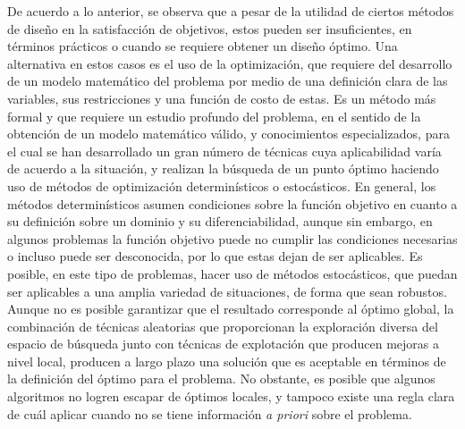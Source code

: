 De acuerdo a lo anterior, se observa que a pesar de la utilidad de ciertos métodos de diseño en la satisfacción de objetivos, estos pueden ser insuficientes, en términos prácticos o cuando se requiere obtener un diseño óptimo. Una alternativa en estos casos es el uso de la optimización, que requiere del desarrollo de un modelo matemático del problema por medio de una definición clara de las variables, sus restricciones y una función de costo de estas. Es un método más formal y que requiere un estudio profundo del problema, en el sentido de la obtención de un modelo matemático válido, y conocimientos especializados, para el cual se han desarrollado un gran número de técnicas cuya aplicabilidad varía de acuerdo a la situación, y realizan la búsqueda de un punto óptimo haciendo uso de métodos de optimización determinísticos o estocásticos. En general, los métodos determinísticos asumen condiciones sobre la función objetivo en cuanto a su definición sobre un dominio y su diferenciabilidad, aunque sin embargo, en algunos problemas la función objetivo puede no cumplir las condiciones necesarias o incluso puede ser desconocida, por lo que estas dejan de ser aplicables. Es posible, en este tipo de problemas, hacer uso de métodos estocásticos, que puedan ser aplicables a una amplia variedad de situaciones, de forma que sean robustos. Aunque no es posible garantizar que el resultado corresponde al óptimo global, la combinación de técnicas aleatorias que proporcionan la exploración diversa del espacio de búsqueda junto con técnicas de explotación que producen mejoras a nivel local, producen a largo plazo una solución que es aceptable en términos de la definición del óptimo para el problema. No obstante, es posible que algunos algoritmos no logren escapar de óptimos locales, y tampoco existe una regla clara de cuál aplicar cuando no se tiene información \textit{a priori} sobre el problema.

